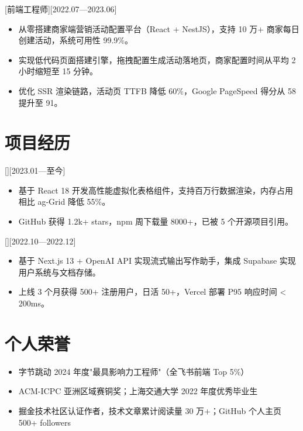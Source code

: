 \documentclass{resume-photo}
\begin{document}
[\textnormal{前端工程师}][2022.07—2023.06]
\begin{itemize}
  \item 从零搭建商家端营销活动配置平台（React + NestJS），支持 10 万+ 商家每日创建活动，系统可用性 99.9\%。
  \item 实现低代码页面搭建引擎，拖拽配置生成活动落地页，商家配置时间从平均 2 小时缩短至 15 分钟。
  \item 优化 SSR 渲染链路，活动页 TTFB 降低 60\%，Google PageSpeed 得分从 58 提升至 91。
\end{itemize}

\section{项目经历}

[][2023.01—至今]
\begin{itemize}
  \item 基于 React 18 开发高性能虚拟化表格组件，支持百万行数据渲染，内存占用相比 ag-Grid 降低 55\%。
  \item GitHub 获得 1.2k+ stars，npm 周下载量 8000+，已被 5 个开源项目引用。
\end{itemize}

[][2022.10—2022.12]
\begin{itemize}
  \item 基于 Next.js 13 + OpenAI API 实现流式输出写作助手，集成 Supabase 实现用户系统与文档存储。
  \item 上线 3 个月获得 500+ 注册用户，日活 50+，Vercel 部署 P95 响应时间 < 200ms。
\end{itemize}

\section{个人荣誉}
\begin{itemize}
  \item 字节跳动 2024 年度"最具影响力工程师"（全飞书前端 Top 5\%）
  \item ACM-ICPC 亚洲区域赛铜奖；上海交通大学 2022 年度优秀毕业生
  \item 掘金技术社区认证作者，技术文章累计阅读量 30 万+；GitHub 个人主页 500+ followers
\end{itemize}
\end{document}
